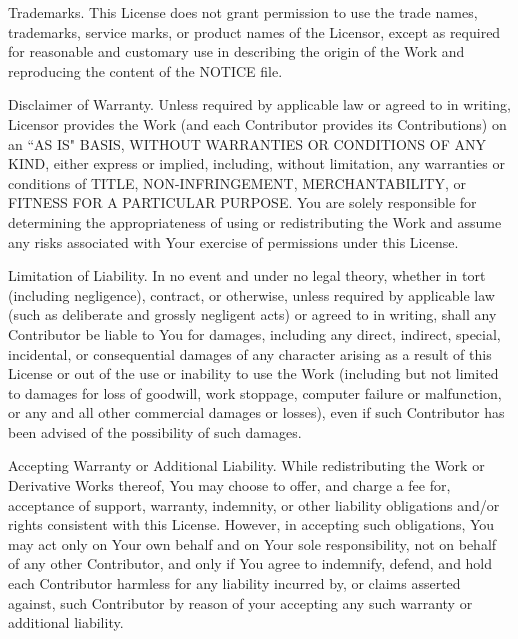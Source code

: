 \begin{numul}
	\item 
	Trademarks. This License does not grant permission to use the trade
	names, trademarks, service marks, or product names of the Licensor,
	except as required for reasonable and customary use in describing the
	origin of the Work and reproducing the content of the NOTICE file.
	
	\item 
	Disclaimer of Warranty. Unless required by applicable law or
	agreed to in writing, Licensor provides the Work (and each
	Contributor provides its Contributions) on an ``AS IS" BASIS,
	WITHOUT WARRANTIES OR CONDITIONS OF ANY KIND, either express or
	implied, including, without limitation, any warranties or conditions
	of TITLE, NON-INFRINGEMENT, MERCHANTABILITY, or FITNESS FOR A
	PARTICULAR PURPOSE. You are solely responsible for determining the
	appropriateness of using or redistributing the Work and assume any
	risks associated with Your exercise of permissions under this License.
	
	\item
	Limitation of Liability. In no event and under no legal theory,
	whether in tort (including negligence), contract, or otherwise,
	unless required by applicable law (such as deliberate and grossly
	negligent acts) or agreed to in writing, shall any Contributor be
	liable to You for damages, including any direct, indirect, special,
	incidental, or consequential damages of any character arising as a
	result of this License or out of the use or inability to use the
	Work (including but not limited to damages for loss of goodwill,
	work stoppage, computer failure or malfunction, or any and all
	other commercial damages or losses), even if such Contributor
	has been advised of the possibility of such damages.
	
	\item
	Accepting Warranty or Additional Liability. While redistributing
	the Work or Derivative Works thereof, You may choose to offer,
	and charge a fee for, acceptance of support, warranty, indemnity,
	or other liability obligations and/or rights consistent with this
	License. However, in accepting such obligations, You may act only
	on Your own behalf and on Your sole responsibility, not on behalf
	of any other Contributor, and only if You agree to indemnify,
	defend, and hold each Contributor harmless for any liability
	incurred by, or claims asserted against, such Contributor by reason
	of your accepting any such warranty or additional liability.							
\end{numul}

